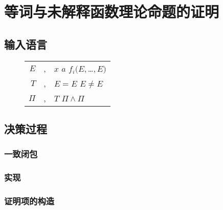 \chapter{等词与未解释函数理论命题的证明}
\label{chap:euf}

\section{输入语言}
\begin{figure}[!htbp]
  \centering
  \begin{tabular}[rcl]{rcl}
    $E$ & \sep{} & $x$ \deli{} $a$ \deli{} $f_i(E,$\ldots$,E)$ \\
    $T$ & \sep{} & $E = E$ \deli{} $E \neq E$ \\
    $\Pi$ & \sep{} & $T$ \deli{} $\Pi \land \Pi$ \\
  \end{tabular}
\end{figure}
\section{决策过程}
\subsection{一致闭包}
\subsection{实现}
\subsection{证明项的构造}
